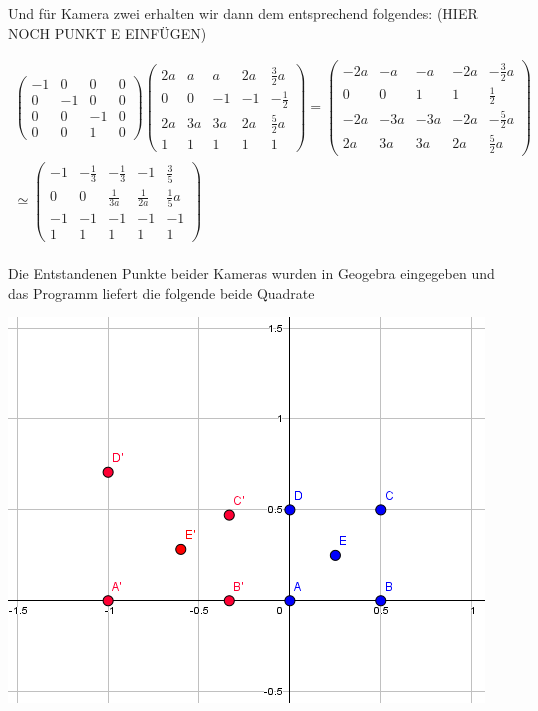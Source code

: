 Und für Kamera zwei erhalten wir dann dem entsprechend folgendes:
(HIER NOCH PUNKT E EINFÜGEN)

\begin{gather}
	\begin{pmatrix}
		-1&0&0&0\\
		0&-1&0&0\\
		0&0&-1&0\\
		0&0&1&0
	\end{pmatrix}
	\begin{pmatrix}
		2a&a&a&2a&\frac{3}{2}a\\
		0&0&-1&-1&-\frac{1}{2}\\
		2a&3a&3a&2a&\frac{5}{2}a\\
		1&1&1&1&1
	\end{pmatrix}=
	\begin{pmatrix}
		-2a&-a&-a&-2a&-\frac{3}{2}a\\
		0&0&1&1&\frac{1}{2}\\
		-2a&-3a&-3a&-2a&-\frac{5}{2}a\\
		2a&3a&3a&2a&\frac{5}{2}a
	\end{pmatrix}\\
	\simeq
	\begin{pmatrix}
		-1&-\frac{1}{3}&-\frac{1}{3}&-1&\frac{3}{5}\\
		0&0&\frac{1}{3a}&\frac{1}{2a}&\frac{1}{5}a\\
		-1&-1&-1&-1&-1\\
		1&1&1&1&1
	\end{pmatrix}
\end{gather}\\

Die Entstandenen Punkte beider Kameras wurden in Geogebra eingegeben und das Programm liefert die folgende beide Quadrate\\

\begin{minipage}{\linewidth}
	\centering
	\includegraphics[width=1.\linewidth]{images/Geogebra.png}
\end{minipage}\\ \\

